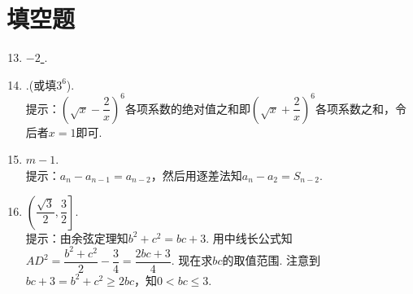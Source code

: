 \documentclass[11pt]{article}
\begin{document}
\section{\heiti 填空题}
\begin{enumerate}
	\setcounter{enumi}{12}
	\item \underline{\quad $ -2 $ \quad}.
	\item \underline{\quad}.(或填\underline{\quad$ 3^6 $\quad}).
	\\ 提示：$ \left ( \sqrt{x}-\dfrac{2}{x}   \right ) ^6 $各项系数的绝对值之和即$ \left ( \sqrt{x}+\dfrac{2}{x}   \right ) ^6 $各项系数之和，令后者$ x=1 $即可.
	\item \underline{\quad $ m-1 $\quad }.
	\\ 提示：$ a_n-a_{n-1}=a_{n-2} $，然后用逐差法知$ a_n-a_2=S_{n-2} $.
	\item \underline{\quad $ \left (\dfrac{\sqrt{3} }{2} ,\dfrac{3}{2}   \right ]  $\quad}.
	\\ 提示：由余弦定理知$ b^2+c^2=bc+3 $. 用中线长公式知$ AD^2=\dfrac{b^2+c^2}{2}-\dfrac{3}{4}=\dfrac{2bc+3}{4} $. 现在求$ bc $的取值范围. 注意到$ bc+3=b^2+c^2\geqslant 2bc $，知$ 0<bc\leqslant 3 $.
\end{enumerate}
\end{document}
